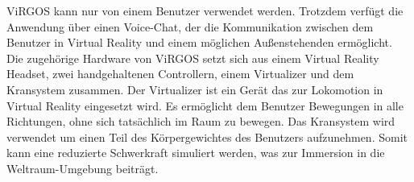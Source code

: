 ViRGOS kann nur von einem Benutzer verwendet werden. Trotzdem verfügt die Anwendung über einen Voice-Chat, der die Kommunikation zwischen dem Benutzer in Virtual Reality und einem möglichen Außenstehenden ermöglicht. \\

Die zugehörige Hardware von ViRGOS setzt sich aus einem Virtual Reality Headset, zwei handgehaltenen Controllern, einem Virtualizer und dem Kransystem zusammen. Der Virtualizer ist ein Gerät das zur Lokomotion in Virtual Reality eingesetzt wird. Es ermöglicht dem Benutzer Bewegungen in alle Richtungen, ohne sich tatsächlich im Raum zu bewegen. Das Kransystem wird verwendet um einen Teil des Körpergewichtes des Benutzers aufzunehmen. Somit kann eine reduzierte Schwerkraft simuliert werden, was zur Immersion in die Weltraum-Umgebung beiträgt. 
 